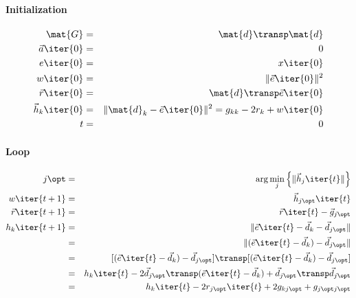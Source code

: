 \documentclass[a4paper,11pt]{report}
\begin{document}
\noindent\paragraph{Initialization}
\begin{eqnarray}
\mat{G} &=& \mat{d}\transp\mat{d}\\
\vec{a}\iter{0} &=& 0\\
e\iter{0} &=& x\iter{0}\\
w\iter{0} &=& \|\vec{e}\iter{0}\|^2\\
\vec{r}\iter{0} &=& \mat{d}\transp\vec{e}\iter{0}\\
\vec{h}_k\iter{0} &=& \|\mat{d}_k-\vec{e}\iter{0}\|^2 = g_{kk} - 2r_{k}
+ w\iter{0}\\
t &=& 0
\end{eqnarray}
\noindent\paragraph{Loop}
\begin{eqnarray}
j\opt &=& \arg\min_j \left\{ \| \vec{h}_j\iter{t} \| \right\}\\
w\iter{t+1} &=& \vec{h}_{j\opt }\iter{t}\\
\vec{r}\iter{t+1} &=& \vec{r}\iter{t} - \vec{g}_{j\opt}\\
h_k\iter{t+1} &=& \|\vec{e}\iter{t} - \vec{d}_k - \vec{d}_{j\opt}\|\\
 &=& \|(\vec{e}\iter{t} - \vec{d}_k) - \vec{d}_{j\opt}\|\\
 &=& [(\vec{e}\iter{t} - \vec{d}_k) -\vec{d}_{j\opt }]\transp[(\vec{e}\iter{t} - \vec{d}_k) -\vec{d}_{j\opt }]\\
 &=& h_k\iter{t} -2\vec{d}_{j\opt }\transp(\vec{e}\iter{t} -
\vec{d}_k) + \vec{d}_{j\opt }\transp\vec{d}_{j\opt }\\
 &=& h_k\iter{t} -2r_{j\opt}\iter{t} +
2g_{kj\opt} + g_{j\opt j\opt} \\
\end{eqnarray}
\end{document}
